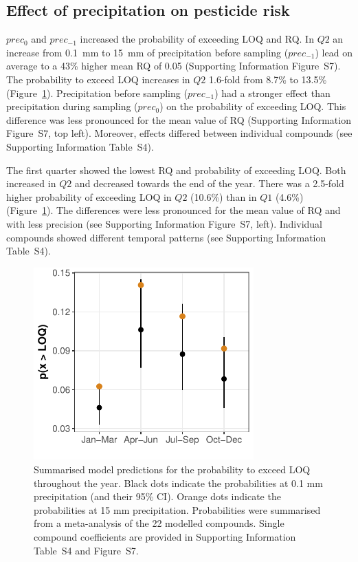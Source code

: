 \documentclass[journal=esthag,manuscript=article]{achemso}
\begin{document}
\subsection{Effect of precipitation on pesticide risk}
$prec_{0}$ and $prec_{-1}$ increased the probability of exceeding LOQ and RQ.
In $Q2$ an increase from 0.1~mm to 15~mm of precipitation before sampling ($prec_{-1}$) lead on average to a 43\% higher mean RQ of 0.05 (Supporting Information Figure~S7).
The probability to exceed LOQ increases in $Q2$ 1.6-fold from 8.7\% to 13.5\% (Figure~\ref{fig:fig5}). %
Precipitation before sampling ($prec_{-1}$) had a stronger effect than precipitation during sampling ($prec_{0}$) on the probability of exceeding LOQ. 
This difference was less pronounced for the mean value of RQ (Supporting Information Figure~S7, top left). 
Moreover, effects differed between individual compounds (see Supporting Information Table~S4). 

The first quarter showed the lowest RQ and probability of exceeding LOQ.
Both increased in $Q2$ and decreased towards the end of the year.
There was a 2.5-fold higher probability of exceeding LOQ in $Q2$ (10.6\%) than in $Q1$ (4.6\%) (Figure~\ref{fig:fig5}).
The differences were less pronounced for the mean value of RQ and with less precision  (see Supporting Information Figure~S7, left).
Individual compounds showed different temporal patterns (see Supporting Information Table~S4). 


\begin{figure}[ht]
  \includegraphics[width=3.33in]{figure5.pdf}
  \caption{Summarised model predictions for the probability to exceed LOQ throughout the year. 
  Black dots indicate the probabilities at 0.1 mm precipitation (and their 95\% CI). 
  Orange dots indicate the probabilities at 15 mm precipitation.
  Probabilities were summarised from a meta-analysis of the 22 modelled compounds.
  Single compound coefficients are provided in Supporting Information Table~S4 and Figure~S7.
  }
  \label{fig:fig5}
\end{figure}
\end{document}
